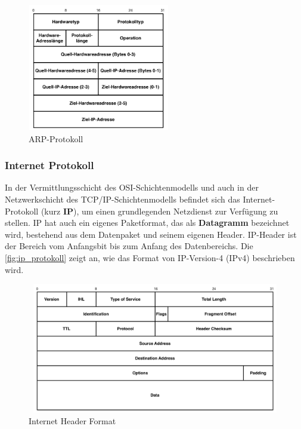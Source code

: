\begin{figure}[htbp]
	\centering
		\includegraphics[width=235px,height=210px]{pictures/arp-protokoll.png}
	\caption[ARP-Protokoll]{ARP-Protokoll \cite{netzmafia}}\label{fig:arp_protokoll}
\end{figure}

\subsubsection{Internet Protokoll}

In der Vermittlungsschicht des OSI-Schichtenmodells und auch in der Netzwerkschicht des TCP/IP-Schichtenmodells befindet sich das Internet-Protokoll (kurz \textbf{IP}), um einen grundlegenden Netzdienst zur Verfügung zu stellen. IP hat auch ein eigenes Paketformat, das als \textbf{Datagramm} bezeichnet wird, bestehend aus dem Datenpaket und seinem eigenen Header. IP-Header ist der Bereich vom Anfangsbit bis zum Anfang des Datenbereichs. Die \autoref{fig:ip_protokoll} zeigt an, wie das Format von IP-Version-4 (IPv4) beschrieben wird. \smallskip \smallskip

\begin{figure}[htbp]
	\centering
		\includegraphics[width=450px,height=215px]{pictures/ip-protokoll.png}
	\caption[Internet Header Format]{Internet Header Format \cite{RFC:791}}\label{fig:ip_protokoll}
\end{figure}

